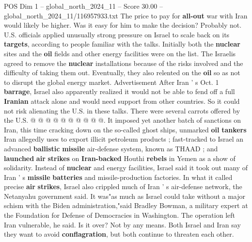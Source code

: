 \begin{textsample}{POS Dim 1 – global\_north\_2024\_11 – Score 30.00 – global\_north\_2024\_11/116957933.txt}
The price to pay for \textbf{all-out} war with Iran would likely be higher.
Was it easy for him to make the decision?
Probably not.
U.S. officials applied unusually strong pressure on Israel to scale back on its \textbf{targets}, according to people familiar with the talks.
Initially both the \textbf{nuclear} sites and the \textbf{oil} fields and other energy facilities were on the list.
The Israelis agreed to remove the \textbf{nuclear} installations because of the risks involved and the difficulty of taking them out.
Eventually, they also relented on the \textbf{oil} so as not to disrupt the global energy market.
Advertisement After Iran ' s Oct. 1 \textbf{barrage}, Israel also apparently realized it would not be able to fend off a full \textbf{Iranian} attack alone and would need support from other countries.
So it could not risk alienating the U.S. in these talks.
There were several carrots offered by the U.S. @ @ @ @ @ @ @ @ @ @.
It imposed yet another batch of sanctions on Iran, this time cracking down on the so-called ghost ships, unmarked \textbf{oil} \textbf{tankers} Iran allegedly uses to export illicit petroleum products ; fast-tracked to Israel an advanced \textbf{ballistic} \textbf{missile} air-defense system, known as THAAD ; and \textbf{launched} \textbf{air} \textbf{strikes} on \textbf{Iran-backed} Houthi \textbf{rebels} in Yemen as a show of solidarity.
Instead of \textbf{nuclear} and energy facilities, Israel said it took out many of Iran ' s \textbf{missile} \textbf{batteries} and missile-production factories.
In what it called precise \textbf{air} \textbf{strikes}, Israel also crippled much of Iran ' s air-defense network, the Netanyahu government said.
It was"as much as Israel could take without a major schism with the Biden administration,"said Bradley Bowman, a military expert at the Foundation for Defense of Democracies in Washington.
The operation left Iran vulnerable, he said.
Is it over?
Not by any means.
Both Israel and Iran say they want to avoid \textbf{conflagration}, but both continue to threaten each other.

\end{textsample}
